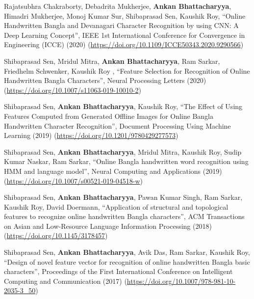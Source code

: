 \documentclass[letterpaper,10.8pt]{article}
\begin{document}
\item{
Rajatsubhra Chakraborty, Debadrita Mukherjee, \textbf{Ankan Bhattacharyya}, Himadri Mukherjee, Monoj Kumar Sur, Shibaprasad Sen, Kaushik Roy, “Online Handwritten Bangla and Devanagari Character Recognition by using CNN: A Deep Learning Concept”, IEEE 1st International Conference for Convergence in Engineering (ICCE) (2020) (\href{https://doi.org/10.1109/ICCE50343.2020.9290566}{https://doi.org/10.1109/ICCE50343.2020.9290566})
}

\item{
Shibaprasad Sen, Mridul Mitra, \textbf{Ankan Bhattacharyya}, Ram Sarkar, Friedhelm Schwenker, Kaushik Roy , “Feature Selection for Recognition of Online Handwritten Bangla Characters”, Neural Processing Letters (2020) (\href{https://doi.org/10.1007/s11063-019-10010-2}{https://doi.org/10.1007/s11063-019-10010-2})
}

\item{
Shibaprasad Sen, \textbf{Ankan Bhattacharyya}, Kaushik Roy, “The Effect of Using Features Computed from Generated Offline Images for Online Bangla Handwritten Character Recognition”, Document Processing Using Machine Learning (2019) (\href{https://doi.org/10.1201/9780429277573}{https://doi.org/10.1201/9780429277573})
}


\item{
Shibaprasad Sen, \textbf{Ankan Bhattacharyya}, Mridul Mitra, Kaushik Roy, Sudip Kumar Naskar, Ram Sarkar, “Online Bangla handwritten word recognition using HMM and language model”, Neural Computing and Applications (2019) (\href{https://doi.org/10.1007/s00521-019-04518-w}{https://doi.org/10.1007/s00521-019-04518-w})
}

\item{
Shibaprasad Sen, \textbf{Ankan Bhattacharyya}, Pawan Kumar Singh, Ram Sarkar, Kaushik Roy, David Doermann, “Application of structural and topological features to recognize online handwritten Bangla characters”, ACM Transactions on Asian and Low-Resource Language Information Processing (2018) (\href{https://doi.org/10.1145/3178457}{https://doi.org/10.1145/3178457})
}

\item{
Shibaprasad Sen, \textbf{Ankan Bhattacharyya}, Avik Das, Ram Sarkar, Kaushik Roy, “Design of novel feature vector for recognition of online handwritten Bangla basic characters”, Proceedings of the First International Conference on Intelligent Computing and Communication (2017) (\href{https://doi.org/10.1007/978-981-10-2035-3_50}{https://doi.org/10.1007/978-981-10-2035-3\_50})
}
\end{document}
